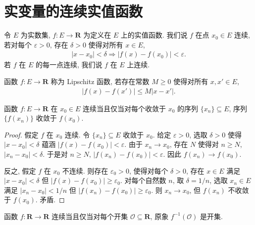 \documentclass[../../main.tex]{subfiles}
\begin{document}
\section{实变量的连续实值函数}\label{section:ch01-连续函数}

\begin{definition}[连续]\label{definition:ch01-连续}
令 $E$ 为实数集, $f:E\to\mathbf{R}$ 为定义在 $E$ 上的实值函数. 我们说 $f$ 在点 $x_{0}\in E$ 连续, 若对每个 $\varepsilon>0$, 存在 $\delta>0$ 使得对所有 $x\in E$,
\begin{align*}
|x-x_{0}|<\delta\Longrightarrow|f(x)-f(x_{0})|<\varepsilon.
\end{align*}
若 $f$ 在 $E$ 的每一点连续, 我们说 $f$ 在 $E$ 上连续.

函数 $f:E\to\mathbf{R}$ 称为 Lipschitz 函数, 若存在常数 $M\geqslant 0$ 使得对所有 $x,x'\in E$,
\begin{align*}
|f(x)-f(x')|\leqslant M|x-x'|.
\end{align*}
\end{definition}

\begin{proposition}[序列连续性]\label{proposition:ch01-序列连续}
函数 $f:E\to\mathbf{R}$ 在 $x_{0}\in E$ 连续当且仅当对每个收敛于 $x_{0}$ 的序列 $\{x_{n}\}\subseteq E$, 序列 $\{f(x_{n})\}$ 收敛于 $f(x_{0})$.
\end{proposition}

\begin{proof}
假定 $f$ 在 $x_{0}$ 连续. 令 $\{x_{n}\}\subseteq E$ 收敛于 $x_{0}$. 给定 $\varepsilon>0$, 选取 $\delta>0$ 使得 $|x-x_{0}|<\delta$ 蕴涵 $|f(x)-f(x_{0})|<\varepsilon$. 由于 $x_{n}\to x_{0}$, 存在 $N$ 使得对 $n\geqslant N$, $|x_{n}-x_{0}|<\delta$. 于是对 $n\geqslant N$, $|f(x_{n})-f(x_{0})|<\varepsilon$. 因此 $f(x_{n})\to f(x_{0})$.

反之, 假定 $f$ 在 $x_{0}$ 不连续. 则存在 $\varepsilon_{0}>0$, 使得对每个 $\delta>0$, 存在 $x\in E$ 满足 $|x-x_{0}|<\delta$ 但 $|f(x)-f(x_{0})|\geqslant\varepsilon_{0}$. 对每个自然数 $n$, 取 $\delta=1/n$, 选取 $x_{n}\in E$ 满足 $|x_{n}-x_{0}|<1/n$ 但 $|f(x_{n})-f(x_{0})|\geqslant\varepsilon_{0}$. 则 $x_{n}\to x_{0}$, 但 $f(x_{n})$ 不收敛于 $f(x_{0})$. 矛盾.
\end{proof}

\begin{proposition}[开集原象刻画]\label{proposition:ch01-原象连续}
函数 $f:\mathbf{R}\to\mathbf{R}$ 连续当且仅当对每个开集 $\mathcal{O}\subseteq\mathbf{R}$, 原象 $f^{-1}(\mathcal{O})$ 是开集.
\end{proposition}
\end{document}
